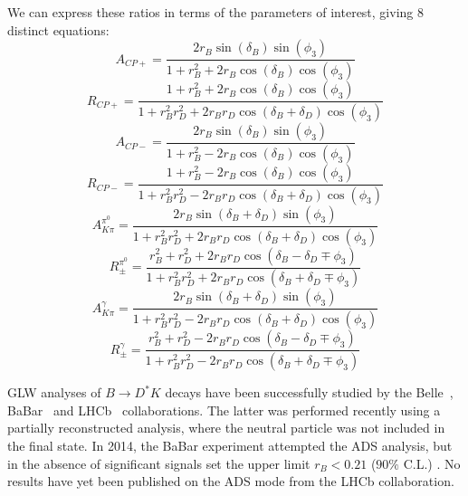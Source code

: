 \documentclass[oneside,12pt]{article}
\begin{document}
We can express these ratios in
terms of the parameters of interest, giving 8 distinct equations: 
  \begin{equation}
    A_{CP+}=\frac{2r_{B}\sin(\delta_{B})\sin(\phi_{3})}{1+r_{B}^{2}+2r_{B}\cos(\delta_{B})\cos(\phi_{3})}
    \label{eq:ACPPlus}
  \end{equation}
  \begin{equation}
    R_{CP+}=\frac{1 + r_{B}^{2} +
    2r_{B}\cos(\delta_{B})\cos(\phi_{3})}{1+r_{B}^{2}r_{D}^{2}+2r_{B}r_{D}\cos(\delta_{B}+\delta_{D})\cos(\phi_{3})}
    \label{eq:RCPPlus}
  \end{equation}
  \begin{equation}
    A_{CP-}=\frac{2r_{B}\sin(\delta_{B})\sin(\phi_{3})}{1+r_{B}^{2}-2r_{B}\cos(\delta_{B})\cos(\phi_{3})}
    \label{eq:ACPMinus}
  \end{equation}
  \begin{equation}
    R_{CP-}=\frac{1 + r_{B}^{2} -
    2r_{B}\cos(\delta_{B})\cos(\phi_{3})}{1+r_{B}^{2}r_{D}^{2}-2r_{B}r_{D}\cos(\delta_{B}+\delta_{D})\cos(\phi_{3})}
    \label{eq:RCPMinus}
  \end{equation}
  \begin{equation}
    A_{K\pi}^{\pi^{0}}=\frac{2r_{B}\sin(\delta_{B}+\delta_{D})\sin(\phi_{3})}{1+r_{B}^{2}r_{D}^{2}+2r_{B}r_{D}\cos(\delta_{B}+\delta_{D})\cos(\phi_{3})}
    \label{eq:AfavPi0}
  \end{equation}
  \begin{equation}
    R_{\pm}^{\pi^{0}}=\frac{r_{B}^{2} + r_{D}^{2} +
    2r_{B}r_{D}\cos(\delta_{B}-\delta_{D}\mp
    \phi_{3})}{1+r_{B}^{2}r_{D}^{2}+2r_{B}r_{D}\cos(\delta_{B}+\delta_{D}\mp
    \phi_{3})} \label{eq:RPlusMinusPi0}
  \end{equation}
  \begin{equation}
    A_{K\pi}^{\gamma}=\frac{2r_{B}\sin(\delta_{B}+\delta_{D})\sin(\phi_{3})}{1+r_{B}^{2}r_{D}^{2}-2r_{B}r_{D}\cos(\delta_{B}+\delta_{D})\cos(\phi_{3})}
    \label{eq:AfavGamma}
  \end{equation}
  \begin{equation}
    R_{\pm}^{\gamma}=\frac{r_{B}^{2} + r_{D}^{2} -
    2r_{B}r_{D}\cos(\delta_{B}-\delta_{D}\mp
    \phi_{3})}{1+r_{B}^{2}r_{D}^{2}-2r_{B}r_{D}\cos(\delta_{B}+\delta_{D}\mp
    \phi_{3})} \label{eq:RPlusMinusGamma}
  \end{equation}

GLW analyses of $B\rightarrow D^{*}K$ decays have been successfully
studied by the Belle~\cite{BelleGLW}, BaBar~\cite{BaBarGLW} and
LHCb~\cite{PartReco} collaborations. The latter was performed recently using a
partially reconstructed analysis, where the neutral particle was not included in the
final state. In 2014, the BaBar experiment attempted the ADS analysis, but in
the absence of significant signals set the upper limit $r_B<0.21$ ($90\%$ C.L.)
\cite{BaBarADS}. No results have yet been published on the ADS mode from the
LHCb collaboration. 
\end{document}
